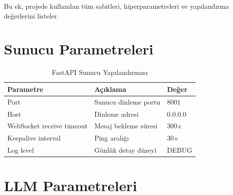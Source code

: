 
Bu ek, projede kullan{\i}lan t\"{u}m sabitleri, hiperparametreleri ve yap{\i}land{\i}rma de\u{g}erlerini listeler.

\section{Sunucu Parametreleri}

\begin{table}[H]
\centering
\caption{FastAPI Sunucu Yap{\i}land{\i}rmas{\i}}
\label{tab:server_params}
\begin{tabularx}{\textwidth}{lXl}
\toprule
\color{chapterBlue}\textbf{Parametre} & \color{chapterBlue}\textbf{A\c{c}{\i}klama} & \color{chapterBlue}\textbf{De\u{g}er} \\
\midrule
Port & Sunucu dinleme portu & 8001 \\
Host & Dinleme adresi & 0.0.0.0 \\
WebSocket receive timeout & Mesaj bekleme s\"{u}resi & 300\,s \\
Keepalive interval & Ping aral{\i}\u{g}{\i} & 30\,s \\
Log level & G\"{u}nl\"{u}k detay d\"{u}zeyi & DEBUG \\
\bottomrule
\end{tabularx}
\end{table}

\section{LLM Parametreleri}

